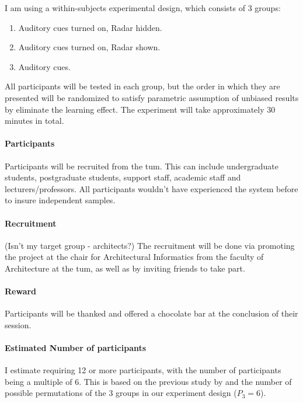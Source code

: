 I am using a within-subjects experimental design, which consists of 3 groups:
\begin{enumerate}
	\item Auditory cues turned on, Radar hidden.
	\item Auditory cues turned on, Radar shown.
	\item Auditory cues.
\end{enumerate}
All participants will be tested in each group, but the order in which they are presented will be randomized to satisfy parametric assumption of unbiased results by eliminate the learning effect. The experiment will take approximately 30 minutes in total.

\paragraph{Participants}
Participants will be recruited from the \gls{tum}. This can include undergraduate students, postgraduate students, support staff, academic staff and lecturers/professors. All participants wouldn't have experienced the system before to insure independent samples.

\paragraph{Recruitment}
(Isn't my target group - architects?) The recruitment will be done via promoting the project at the chair for Architectural Informatics from the faculty of Architecture at the \gls{tum}, as well as by inviting friends to take part. 

\paragraph{Reward}
Participants will be thanked and offered a chocolate bar at the conclusion of their session. 

\paragraph{Estimated Number of participants}
I estimate requiring 12 or more participants, with the number of participants being a multiple of 6. This is based on the previous study by \cite{gutwin_chalk_2011} and the number of possible permutations of the 3 groups in our experiment design ($P_{3}=6$).



